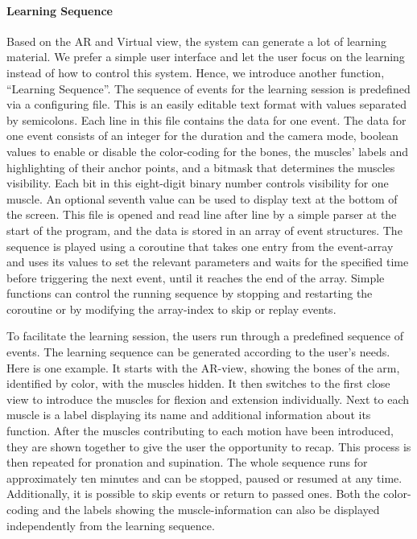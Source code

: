 \paragraph{Learning Sequence}
Based on the AR and Virtual view, the system can generate a lot of learning material. We prefer a simple user interface and let the user focus on the learning instead of how to control this system. 
Hence, we introduce another function, ``Learning Sequence''.
The sequence of events for the learning session is predefined via a configuring file. This is an easily editable text format with values separated by semicolons. Each line in this file contains the data for one event. The data for one event consists of an integer for the duration and the camera mode, boolean values to enable or disable the color-coding for the bones, the muscles' labels and highlighting of their anchor points, and a bitmask that determines the muscles visibility. Each bit in this eight-digit binary number controls visibility for one muscle. An optional seventh value can be used to display text at the bottom of the screen. 
This file is opened and read line after line by a simple parser at the start of the program, and the data is stored in an array of event structures. 
The sequence is played using a coroutine that takes one entry from the event-array and uses its values to set the relevant parameters and waits for the specified time before triggering the next event, until it reaches the end of the array. Simple functions can control the running sequence by stopping and restarting the coroutine or by modifying the array-index to skip or replay events.

To facilitate the learning session, the users run through a predefined sequence of events. The learning sequence can be generated according to the user's needs. Here is one example. 
It starts with the AR-view, showing the bones of the arm, identified by color, with the muscles hidden. It then switches to the first close view to introduce the muscles for flexion and extension individually. Next to each muscle is a label displaying its name and additional information about its function. After the muscles contributing to each motion have been introduced, they are shown together to give the user the opportunity to recap. This process is then repeated for pronation and supination. 
The whole sequence runs for approximately ten minutes and can be stopped, paused or resumed at any time. Additionally, it is possible to skip events or return to passed ones. Both the color-coding and the labels showing the muscle-information can also be displayed independently from the learning sequence.

